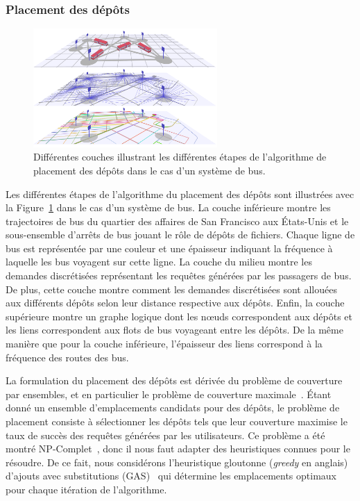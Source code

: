 
\subsubsection{Placement des dépôts} 
 
\begin{figure} 
    \vspace{-10pt} 
    \centering 
    \includegraphics[width=7cm]{figures-fr/bus-distribution-system-fr.pdf} 
    \caption{Différentes couches illustrant les différentes étapes de l’algorithme de placement des dépôts dans le cas d’un système de bus.} 
    \label{fig:placement-alg-fr} 
\end{figure} 
Les différentes étapes de l’algorithme du placement des dépôts sont illustrées avec la Figure~\ref{fig:placement-alg-fr} dans le cas d’un système de bus. La couche inférieure montre les trajectoires de bus du quartier des affaires de San Francisco aux États-Unis et le sous-ensemble d’arrêts de bus jouant le rôle de dépôts de fichiers. Chaque ligne de bus est représentée par une couleur et une épaisseur indiquant la fréquence à laquelle les bus voyagent sur cette ligne. La couche du milieu montre les demandes discrétisées représentant les requêtes générées par les passagers de bus. De plus, cette couche montre comment les demandes discrétisées sont allouées aux différents dépôts selon leur distance respective aux dépôts. Enfin, la couche supérieure montre un graphe logique dont les nœuds correspondent aux dépôts et les liens correspondent aux flots de bus voyageant entre les dépôts. De la même manière que pour la couche inférieure, l’épaisseur des liens correspond à la fréquence des routes des bus. 

La formulation du placement des dépôts est dérivée du problème de couverture par ensembles, et en particulier le problème de couverture maximale~\cite{church1974maximal}. Étant donné un ensemble d’emplacements candidats pour des dépôts, le problème de placement consiste à sélectionner les dépôts tels que leur couverture maximise le taux de succès des requêtes générées par les utilisateurs. Ce problème a été montré NP-Complet~\cite{megiddo1983maximum}, donc il nous faut adapter des heuristiques connues pour le résoudre. De ce fait, nous considérons l’heuristique gloutonne (\textit{greedy} en anglais) d’ajouts avec substitutions (GAS)~\cite{church1974maximal} qui détermine les emplacements optimaux pour chaque itération de l’algorithme.  
 
